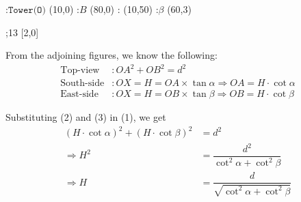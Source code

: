   \begin{marginfigure}[0.5cm]
      :$\texttt{Tower(O)}$ (10,0)
      :$B$ (80,0)
      : (10,50)
      :$\beta$ (60,3)

    \figdrawbegin{}
      \figdrawline [0,1,2,0]
      ;13 [2,0]
    \figdrawend
		\centerline{\box\figBoxA}
  \end{marginfigure}
\fi  

\begin{solution}[\halfpage]
	From the adjoining figures, we know the following:
	\begin{align}
		\text{Top-view} &: OA^2 + OB^2 = d^2 \\
		\text{South-side} &: OX = H = OA \times\tan\alpha \Rightarrow OA = H\cdot\cot\alpha \\
		\text{East-side} &: OX = H = OB \times\tan\beta \Rightarrow OB = H\cdot\cot\beta
	\end{align}
	
	Substituting (2) and (3) in (1), we get
	\begin{align}
		(H\cdot\cot\alpha)^2 + (H\cdot\cot\beta)^2 &= d^2 \\
		\Rightarrow H^2 &= \dfrac{d^2}{\cot^2\alpha + \cot^2\beta} \\
		\Rightarrow H &= \dfrac{d}{\sqrt{\cot^2\alpha + \cot^2\beta}}
	\end{align}
\end{solution}
